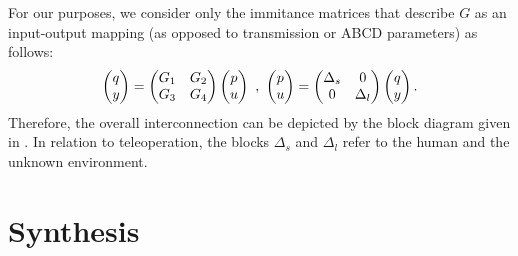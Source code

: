 For our purposes, we consider only the immitance 
matrices that describe $G$ as an input-output mapping (as opposed to transmission or ABCD parameters) as {follows}:
\begin{equation}
\begin{pmatrix}q\\y\end{pmatrix}=\begin{pmatrix}G_1 &G_2\\G_3 &G_4\end{pmatrix}\begin{pmatrix}p\\u\end{pmatrix} \ , \ \begin{pmatrix}p\\u\end{pmatrix}=\begin{pmatrix}\Delta_s &0\\0&\Delta_l\end{pmatrix} \begin{pmatrix}q\\y\end{pmatrix}.
\end{equation}
Therefore, the overall interconnection can be {depicted} by the block diagram given in . 
In relation to teleoperation, the {blocks} $\Delta_s$ and $\Delta_l$ refer to the human and the unknown environment. 



\section{Synthesis}